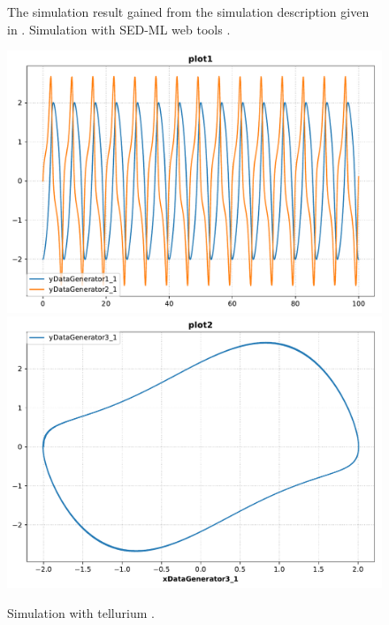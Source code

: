 \begin{figure}[ht]
\begin{minipage}{0.47\textwidth}
        \caption{The simulation result gained from the simulation description given in . Simulation with SED-ML web tools \citep{bergmann2017sed}.}
    \end{minipage}\hfill
    \begin{minipage}{0.47\textwidth}
        \centering
        \includegraphics[width=1.0\textwidth]{examples/vanderpol-sbml/results/tellurium/plot1}
        \includegraphics[width=1.0\textwidth]{examples/vanderpol-sbml/results/tellurium/plot2}
        \caption{Simulation with tellurium \citep{tellurium}.}
    \end{minipage}
    \label{fig:lorenz-sbml}
\end{figure}


